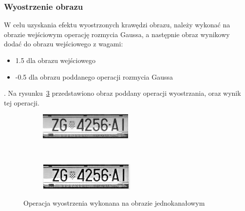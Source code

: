 \subsubsection{Wyostrzenie obrazu}
W celu uzyskania efektu wyostrzonych krawędzi obrazu, należy wykonać na obrazie wejściowym operację rozmycia Gaussa, a następnie obraz wynikowy dodać do obrazu wejściowego z wagami:
\begin{itemize}
  \item 1.5 dla obrazu wejściowego
  \item -0.5 dla obrazu poddanego operacji rozmycia Gaussa
\end{itemize}. Na rysunku~\ref{fig:image_sharpen} przedstawiono obraz poddany operacji wyostrzania, oraz wynik tej operacji.
\begin{figure}
  \centering
  \begin{subfigure}[b]{0.45\textwidth}
    \includegraphics[width=\textwidth]{img/image-sharpen-before}
    \label{fig:image_sharpen_before}
  \end{subfigure}
  ~
  \begin{subfigure}[b]{0.45\textwidth}
    \includegraphics[width=\textwidth]{img/image-sharpen-after}
    \label{fig:image_sharpen_after}
  \end{subfigure}
  \caption{Operacja wyostrzenia wykonana na obrazie jednokanałowym}
  \label{fig:image_sharpen}
\end{figure}
